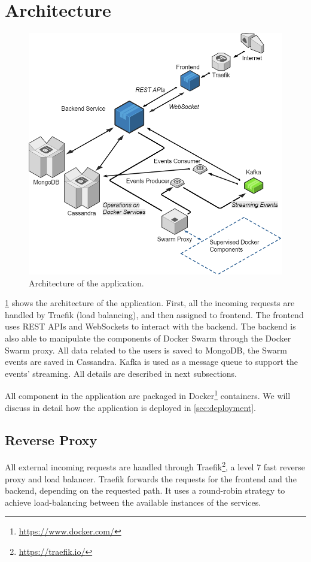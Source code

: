 \section{Architecture}
\label{sec:architecture}

\begin{figure}[h]
	\centering
	\includegraphics[width=0.92\columnwidth]{architecture}
	\caption{Architecture of the application.}
	\label{fig:architecture}
\end{figure}

\cref{fig:architecture} shows the architecture of the application.
First, all the incoming requests are handled by Traefik (load balancing), and then assigned to frontend. The frontend uses REST APIs and WebSockets to interact with the backend. 
The backend is also able to manipulate the components of Docker Swarm through the Docker Swarm proxy.
All data related to the users is saved to MongoDB, the Swarm events are saved in Cassandra.
Kafka is used as a message queue to support the events' streaming.
All details are described in next subsections.

All component in the application are packaged in Docker\footnote{\url{https://www.docker.com/}} containers.
We will discuss in detail how the application is deployed in \cref{sec:deployment}.

\subsection{Reverse Proxy}
All external incoming requests are handled through Traefik\footnote{\url{https://traefik.io/}}, a level 7 fast reverse proxy and load balancer.
Traefik forwards the requests for the frontend and the backend, depending on the requested path.
It uses a round-robin strategy to achieve load-balancing between the available instances of the services.

